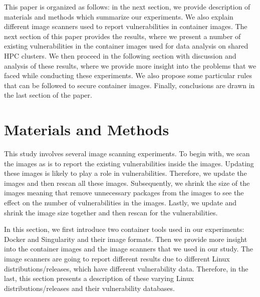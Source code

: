 \documentclass[a4paper,num-refs]{oup-contemporary}
\begin{document}
This paper is organized as follows: in the next section, we provide description
of materials and methods which summarize our experiments. We also explain different
image scanners used to report
vulnerabilities in container images. The next section of this paper provides the results, where we
present a number of existing vulnerabilities in the container images
used for data analysis on shared HPC clusters. We then proceed in the following section with 
discussion and analysis of these results, where we provide more insight into the problems that 
we faced while conducting these experiments. We also propose some
particular rules that can be followed to secure container images. Finally, conclusions are drawn
in the last section of the paper.

\section{Materials and Methods}

This study involves several image scanning experiments. To begin with,
we scan the images as is to report the existing vulnerabilities
inside the images. Updating these images is likely to play a role in vulnerabilities. Therefore, we
update the images and then rescan all these
images.
Subsequently, we shrink the size of the images
meaning that remove unnecessary packages from the images to see the effect on the number of
vulnerabilities in the images.
Lastly, we update and shrink the image size together and then
rescan for the vulnerabilities.

In this section, we first
introduce two container tools used in our experiments: Docker and
Singularity and their image formats. Then we provide more insight
into the container images and the image scanners that we used in our study.
The image scanners are going to report different results due to different Linux
distributions/releases, which have different vulnerability data. Therefore, in the last, this section presents a
description of these varying Linux distributions/releases and their
vulnerability databases.

\end{document}
